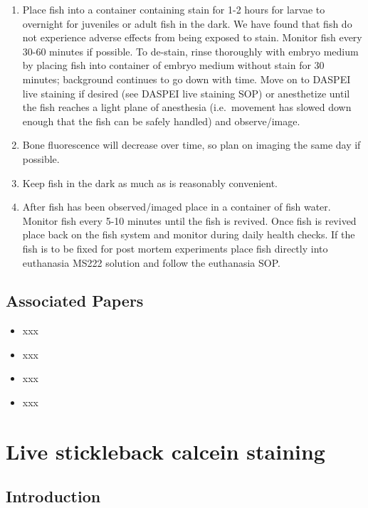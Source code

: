 \documentclass[
  letterpaper,
  DIV=11,
  numbers=noendperiod]{scrreprt}
\providecommand{\tightlist}{%
  \setlength{\itemsep}{0pt}\setlength{\parskip}{0pt}}\usepackage{longtable,booktabs,array}
\begin{document}
\begin{enumerate}
\def\labelenumi{\arabic{enumi}.}
\tightlist
\item
  Place fish into a container containing stain for 1-2 hours for larvae
  to overnight for juveniles or adult fish in the dark. We have found
  that fish do not experience adverse effects from being exposed to
  stain. Monitor fish every 30-60 minutes if possible. To de-stain,
  rinse thoroughly with embryo medium by placing fish into container of
  embryo medium without stain for 30 minutes; background continues to go
  down with time. Move on to DASPEI live staining if desired (see DASPEI
  live staining SOP) or anesthetize until the fish reaches a light plane
  of anesthesia (i.e.~movement has slowed down enough that the fish can
  be safely handled) and observe/image.
\item
  Bone fluorescence will decrease over time, so plan on imaging the same
  day if possible.
\item
  Keep fish in the dark as much as is reasonably convenient.
\item
  After fish has been observed/imaged place in a container of fish
  water. Monitor fish every 5-10 minutes until the fish is revived. Once
  fish is revived place back on the fish system and monitor during daily
  health checks. If the fish is to be fixed for post mortem experiments
  place fish directly into euthanasia MS222 solution and follow the
  euthanasia SOP.
\end{enumerate}

\hypertarget{associated-papers-32}{%
\section{Associated Papers}\label{associated-papers-32}}

\begin{itemize}
\tightlist
\item
  xxx
\item
  xxx
\item
  xxx
\item
  xxx
\end{itemize}

\hypertarget{sec-vert_exp_live_calcein_SB}{%
\chapter{Live stickleback calcein
staining}\label{sec-vert_exp_live_calcein_SB}}

\hypertarget{introduction-54}{%
\section{Introduction}\label{introduction-54}}
\end{document}
